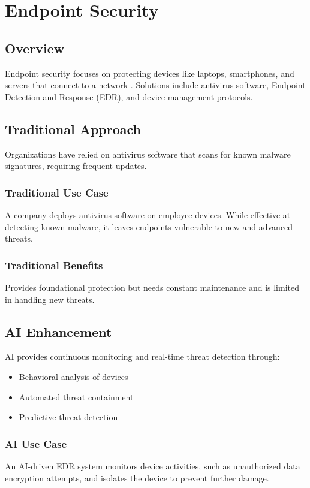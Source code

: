 \documentclass[10pt,a4paper]{article}
\begin{document}
\section{Endpoint Security}
\subsection{Overview}
Endpoint security focuses on protecting devices like laptops, smartphones, and servers that connect to a network \cite{unknown}. Solutions include antivirus software, Endpoint Detection and Response (EDR), and device management protocols.

\subsection{Traditional Approach}
Organizations have relied on antivirus software that scans for known malware signatures, requiring frequent updates.

\subsubsection{Traditional Use Case}
A company deploys antivirus software on employee devices. While effective at detecting known malware, it leaves endpoints vulnerable to new and advanced threats.

\subsubsection{Traditional Benefits}
Provides foundational protection but needs constant maintenance and is limited in handling new threats.

\subsection{AI Enhancement}
AI provides continuous monitoring and real-time threat detection through:
\begin{itemize}\itemsep0.5em
    \item Behavioral analysis of devices
    \item Automated threat containment
    \item Predictive threat detection
\end{itemize}

\subsubsection{AI Use Case}
An AI-driven EDR system monitors device activities, such as unauthorized data encryption attempts, and isolates the device to prevent further damage.
\end{document}
